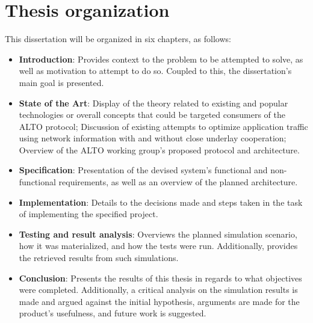 \section{Thesis organization}

    This dissertation will be organized in six chapters, as follows:

\begin{itemize}
    \item \textbf{Introduction}: Provides context to the problem to be attempted to solve, as well as motivation to attempt to do so. Coupled to this, the dissertation's main goal is presented.
    \item \textbf{State of the Art}: Display of the theory related to existing and popular technologies or overall concepts that could be targeted consumers of the ALTO protocol; Discussion of existing attempts to optimize application traffic using network information with and without close underlay cooperation; Overview of the ALTO working group's proposed protocol and architecture.
    \item \textbf{Specification}: Presentation of the devised system's functional and non-functional requirements, as well as an overview of the planned architecture.
    \item \textbf{Implementation}: Details to the decisions made and steps taken in the task of implementing the specified project.
    \item \textbf{Testing and result analysis}: Overviews the planned simulation scenario, how it was materialized, and how the tests were run. Additionally, provides the retrieved results from such simulations.
    \item \textbf{Conclusion}: Presents the results of this thesis in regards to what objectives were completed. Additionally, a critical analysis on the simulation results is made and argued against the initial hypothesis, arguments are made for the product's usefulness, and future work is suggested.
\end{itemize}{}

